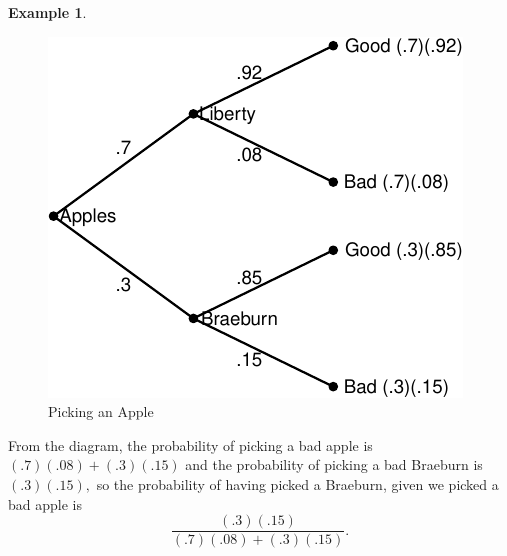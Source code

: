 \documentclass[
]{book}
\theoremstyle{definition}
\theoremstyle{definition}
\newtheorem{example}{Example}[chapter]
\theoremstyle{definition}
\theoremstyle{definition}
\theoremstyle{remark}
\begin{document}
\begin{example}
\begin{figure}
\centering
\includegraphics{math340-notes_files/figure-latex/bayes-apple-1.pdf}
\caption{\label{fig:bayes-apple}Picking an Apple}
\end{figure}

From the diagram, the probability of picking a bad apple is \((.7)(.08) + (.3)(.15)\) and the probability of picking a bad Braeburn is \((.3)(.15),\) so the probability of having picked a Braeburn, given we picked a bad apple is \[\frac{(.3)(.15)}{(.7)(.08) + (.3)(.15)}.\]
\end{example}
\end{document}
